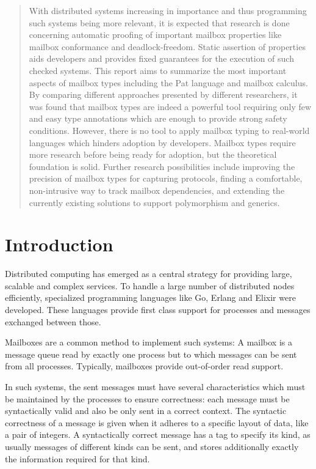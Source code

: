 
\begin{abstract}

With distributed systems increasing in importance and thus programming such systems being more relevant, it is expected that research is done concerning automatic proofing of important mailbox properties like mailbox conformance and deadlock-freedom. Static assertion of properties aids developers and provides fixed guarantees for the execution of such checked systems. This report aims to summarize the most important aspects of mailbox types including the Pat language and mailbox calculus. By comparing different approaches presented by different researchers, it was found that mailbox types are indeed a powerful tool requiring only few and easy type annotations which are enough to provide strong safety conditions. However, there is no tool to apply mailbox typing to real-world languages which hinders adoption by developers. Mailbox types require more research before being ready for adoption, but the theoretical foundation is solid. Further research possibilities include improving the precision of mailbox types for capturing protocols, finding a comfortable, non-intrusive way to track mailbox dependencies, and extending the currently existing solutions to support polymorphism and generics.

\end{abstract}



\section{Introduction}
\label{sec:introduction}

Distributed computing has emerged as a central strategy for providing large, scalable and complex services.
To handle a large number of distributed nodes efficiently, specialized programming languages like Go, Erlang and Elixir were developed.
These languages provide first class support for processes and messages exchanged between those.

Mailboxes are a common method to implement such systems: A mailbox is a message queue read by exactly one process but to which messages can be sent from all processes.
Typically, mailboxes provide out-of-order read support.

In such systems, the sent messages must have several characteristics which must be maintained by the processes to ensure correctness: each message must be syntactically valid and also be only sent in a correct context.
The syntactic correctness of a message is given when it adheres to a specific layout of data, like a pair of integers.
A syntactically correct message has a tag to specify its kind, as usually messages of different kinds can be sent, and stores additionally exactly the information required for that kind.

